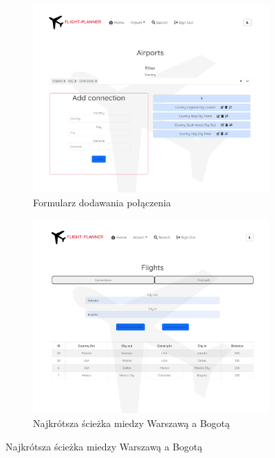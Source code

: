 \documentclass[12pt]{article}
\begin{document}
\begin{figure}[!ht]
    \begin{subfigure}{.5\linewidth}
        \centering
        \includegraphics[width=0.95\linewidth]{6} 
        \caption{Formularz dodawania połączenia}
    \end{subfigure}
    \begin{subfigure}{.5\linewidth}
        \centering
        \includegraphics[width=0.95\linewidth]{8}  
        \caption{Najkrótsza ścieżka miedzy Warszawą a Bogotą}
    \end{subfigure}
\end{figure}
\newpage
\end{document}

